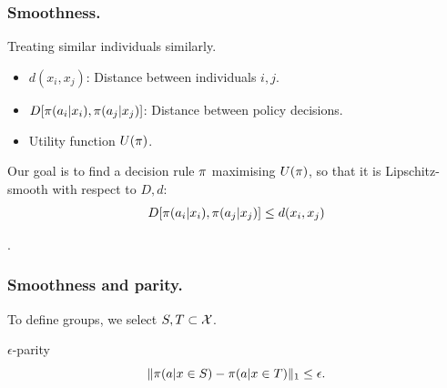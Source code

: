   \begin{frame}\frametitle{Smoothness.}
    \begin{block}{Treating similar individuals similarly.}
      \begin{itemize}
      \item $d(x_i,x_j)$: Distance between individuals $i,j$.
      \item $D[\pi(a_i | x_i), \pi(a_j | x_j)]$: Distance between policy decisions.
      \item Utility function $U(\pi)$.
      \end{itemize}
      Our goal is to find a decision rule $\pi$ maximising  $U(\pi)$, 
      so that it is Lipschitz-smooth with respect to $D, d$:
      \[
        D[\pi(a_i | x_i), \pi(a_j | x_j)] \leq d(x_i,x_j)
      \]
    \end{block}
    .
  \end{frame}

  \begin{frame}\frametitle{Smoothness and parity.}
    To define groups, we select $S, T \subset {\mathcal{X}}$.
    \begin{definition}{$\epsilon$-parity}
      \[
        \|\pi(a | x \in S) - \pi(a | x \in T)\|_1 \leq \epsilon.
      \]
    \end{definition}
  \end{frame}


  
